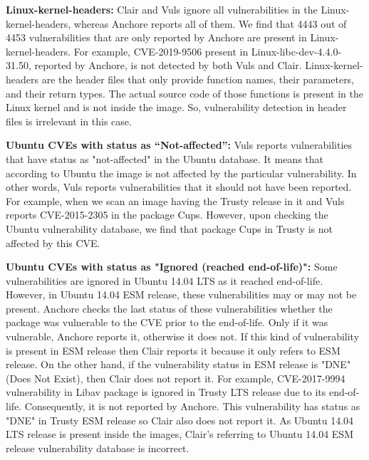\documentclass[a4paper,num-refs]{oup-contemporary}
\begin{document}
\textbf{Linux-kernel-headers:} Clair and Vuls ignore all vulnerabilities in the Linux-kernel-headers,
whereas Anchore reports all of them.
We find that 4443 out of 4453 vulnerabilities that are only reported by Anchore are present in Linux-kernel-headers.
For example, CVE-2019-9506 present in Linux-libc-dev-4.4.0-31.50, reported by Anchore, is not
detected by both Vuls and Clair.
Linux-kernel-headers are the header files that only provide function names, their parameters, and their
return types.
The actual source code of those functions is present in the Linux kernel and is not inside the image.
So, vulnerability detection in header files
is irrelevant in this case.

\textbf{Ubuntu CVEs with status as “Not-affected”:} Vuls reports vulnerabilities that have status
as "not-affected" in the Ubuntu database. It means that according to Ubuntu the image is not affected
by the particular vulnerability. In other words, Vuls reports vulnerabilities that it should not have been reported.
For example, when we scan an image having the Trusty release in it and Vuls reports CVE-2015-2305
in the package Cups. However, upon checking the Ubuntu vulnerability database, we find that package Cups in Trusty is not
affected by this CVE.

\textbf{Ubuntu CVEs with status as "Ignored (reached end-of-life)":}
Some vulnerabilities are ignored in Ubuntu 14.04 LTS as it reached end-of-life. 
However, in Ubuntu 14.04 ESM release, these vulnerabilities may or may not be present.
Anchore checks the last status of these vulnerabilities whether the package was vulnerable to the CVE
prior to the end-of-life. Only if it was vulnerable, Anchore reports it, otherwise it does not.
If this kind of vulnerability is present in ESM release then Clair reports it because it
only refers to ESM release. On the other hand, if the vulnerability
status in ESM release is "DNE" (Does Not Exist), then Clair does not report it. 
For example, CVE-2017-9994 vulnerability in Libav package is ignored in Trusty LTS release due to its end-of-life.
Consequently, it is not reported by Anchore. This vulnerability has status as "DNE" in Trusty ESM
release so Clair also does not report it. As Ubuntu 14.04 LTS release is present inside the images,
Clair's referring to Ubuntu 14.04 ESM release vulnerability database is incorrect.
\end{document}
